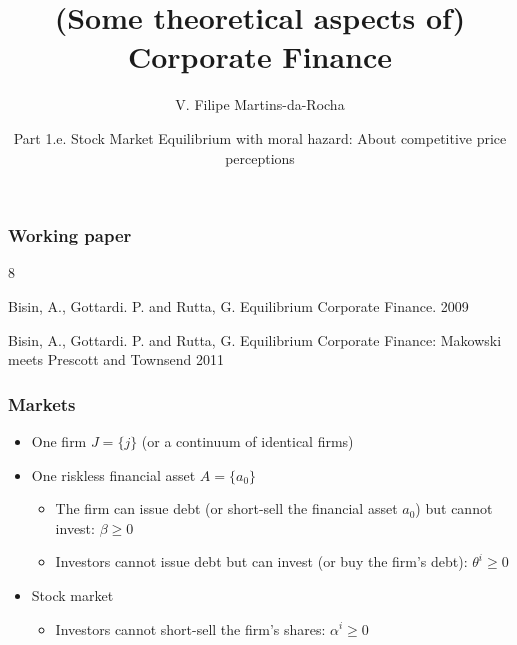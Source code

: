 \documentclass[blue]{beamer}
\title[Corporate Finance]{(Some theoretical aspects of) \\ Corporate Finance}
\author[V. F. Martins-da-Rocha]{V. Filipe Martins-da-Rocha}
\institute[FGV]{Escola de P\'os-gradua\c{c}\~ao em Economia \\~\\ Funda\c{c}\~ao Getulio Vargas}
\date[3º trimestre, 2012]{Part 1.e. Stock Market Equilibrium with moral hazard: About competitive price perceptions}
\def\geq{\geqslant}
\theoremstyle{definition}
\theoremstyle{example}
\begin{document}
\frame{\titlepage}



\begin{frame}\frametitle{Working paper}

\begin{thebibliography}{8}


  \beamertemplatearticlebibitems

    Bisin, A., Gottardi. P. and Rutta, G.
    \newblock Equilibrium Corporate Finance.
     2009

    Bisin, A., Gottardi. P. and Rutta, G.
    \newblock Equilibrium Corporate Finance: Makowski meets Prescott and Townsend
     2011

    \end{thebibliography}

\end{frame}


\begin{frame}\frametitle{Markets}

\begin{itemize}
\item One firm $J=\{j\}$ (or a continuum of identical firms)
\item One riskless financial asset $A=\{a_0\}$
    \begin{itemize}
    \item The firm can issue debt (or short-sell the financial asset $a_0$) but cannot invest: $\beta \geq 0$
    \item Investors cannot issue debt but can invest (or buy the firm's debt): $\theta^i \geq 0$
    \end{itemize}
\item Stock market
    \begin{itemize}
    \item Investors cannot short-sell the firm's shares: $\alpha^i \geq 0$
    \end{itemize}
\end{itemize}

\end{frame}



\end{document}
